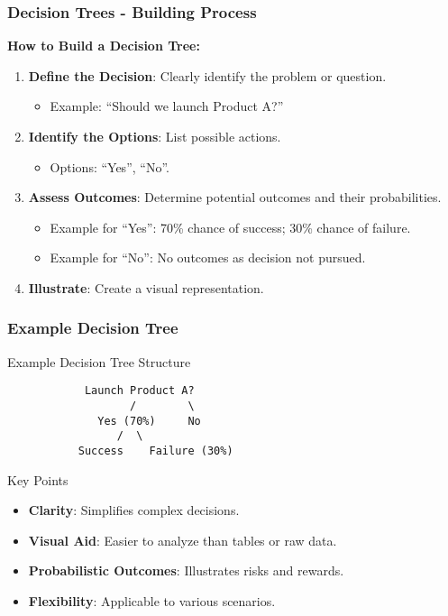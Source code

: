 \documentclass[aspectratio=169]{beamer}
\begin{document}
\begin{frame}[fragile]
    \frametitle{Decision Trees - Building Process}
    \textbf{How to Build a Decision Tree:}
    \begin{enumerate}
        \item \textbf{Define the Decision}: Clearly identify the problem or question.
            \begin{itemize}
                \item Example: ``Should we launch Product A?''
            \end{itemize}
        \item \textbf{Identify the Options}: List possible actions.
            \begin{itemize}
                \item Options: ``Yes'', ``No''.
            \end{itemize}
        \item \textbf{Assess Outcomes}: Determine potential outcomes and their probabilities.
            \begin{itemize}
                \item Example for ``Yes'': 70\% chance of success; 30\% chance of failure.
                \item Example for ``No'': No outcomes as decision not pursued.
            \end{itemize}
        \item \textbf{Illustrate}: Create a visual representation.
    \end{enumerate}
\end{frame}

\begin{frame}[fragile]
    \frametitle{Example Decision Tree}
    \begin{block}{Example Decision Tree Structure}
    \begin{lstlisting}
            Launch Product A?
                   /        \
              Yes (70%)     No
                 /  \
           Success    Failure (30%)
    \end{lstlisting}
    \end{block}

    \begin{block}{Key Points}
        \begin{itemize}
            \item \textbf{Clarity}: Simplifies complex decisions.
            \item \textbf{Visual Aid}: Easier to analyze than tables or raw data.
            \item \textbf{Probabilistic Outcomes}: Illustrates risks and rewards.
            \item \textbf{Flexibility}: Applicable to various scenarios.
        \end{itemize}
    \end{block}
\end{frame}
\end{document}
